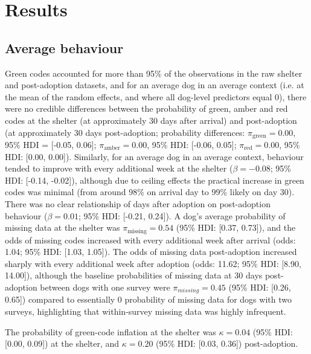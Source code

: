 \documentclass[12pt]{article}
\begin{document}
\section{Results}

\subsection{Average behaviour}
Green codes accounted for more than 95\% of the observations in the raw shelter and post-adoption datasets, and for an average dog in an average context (i.e. at the mean of the random effects, and where all dog-level predictors equal 0), there were no credible differences between the probability of green, amber and red codes at the shelter (at approximately 30 days after arrival) and post-adoption (at approximately 30 days post-adoption; probability differences: $\pi_{\text{green}} = 0.00$, 95\% HDI = [-0.05, 0.06]; $\pi_{\text{amber}} = 0.00$, 95\% HDI: [-0.06, 0.05]; $\pi_{\text{red}} = 0.00$, 95\% HDI: [0.00, 0.00]). Similarly, for an average dog in an average context, behaviour tended to improve with every additional week at the shelter ($\beta = -0.08$; 95\% HDI: [-0.14, -0.02]), although due to ceiling effects the practical increase in green codes was minimal (from around 98\% on arrival day to 99\% likely on day 30). There was no clear relationship of days after adoption on post-adoption behaviour ($\beta = 0.01$; 95\% HDI: [-0.21, 0.24]). A dog's average probability of missing data at the shelter was $\pi_{\text{missing}} = 0.54$ (95\% HDI: [0.37, 0.73]), and the odds of missing codes increased with every additional week after arrival (odds: 1.04; 95\% HDI: [1.03, 1.05]). The odds of missing data post-adoption increased sharply with every additional week after adoption (odds: 11.62; 95\% HDI: [8.90, 14.00]), although the baseline probabilities of missing data at 30 days post-adoption between dogs with one survey were $\pi_{missing} = 0.45$ (95\% HDI: [0.26, 0.65]) compared to essentially 0 probability of missing data for dogs with two surveys, highlighting that within-survey missing data was highly infrequent.

The probability of green-code inflation at the shelter was $\kappa = 0.04$ (95\% HDI: [0.00, 0.09]) at the shelter, and $\kappa = 0.20$ (95\% HDI: [0.03, 0.36]) post-adoption.
\end{document}
